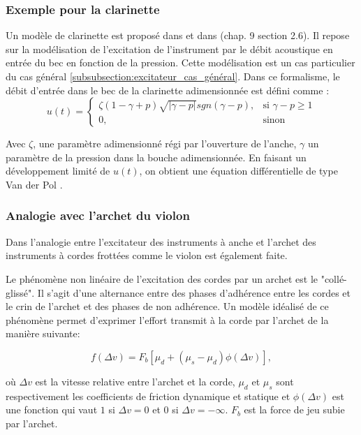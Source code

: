 \documentclass[atiam, article]{rapport} %
\begin{document}
\subsubsection{Exemple pour la clarinette}
Un modèle de clarinette est proposé dans \cite{missoum_explicit_2014} et dans \cite{chaigne2008acoustique} (chap. 9 section 2.6). Il repose sur la modélisation de l'excitation de l'instrument par le débit acoustique en entrée du bec en fonction de la pression. Cette modélisation est un cas particulier du cas général \ref{subsubsection:excitateur_cas_général}. 
Dans ce formalisme, le débit d'entrée dans le bec de la clarinette adimensionnée est défini comme : \\

\begin{equation}
    u(t) = \begin{cases}
    \zeta(1-\gamma+p)\sqrt{|\gamma-p|}sgn(\gamma-p),& \text{si }\gamma-p\geq 1\\
    0,              & \text{sinon}
\end{cases}
\end{equation}

Avec $\zeta$, une paramètre adimensionné régi par l'ouverture de l'anche, $\gamma$ un paramètre de la pression dans la bouche adimensionnée. En faisant un développement limité de $u(t)$, on obtient une équation différentielle de type Van der Pol \cite{chaigne2008acoustique}.

\subsubsection{Analogie avec l'archet du violon}

Dans \cite{ollivier_idealized_2004} l'analogie entre l'excitateur des instruments à anche et l'archet des instruments à cordes frottées comme le violon est également faite. 

Le phénomène non linéaire de l'excitation des cordes par un archet est le "collé-glissé". Il s'agit d'une alternance entre des phases d'adhérence entre les cordes et le crin de l'archet et des phases de non adhérence. Un modèle idéalisé de ce phénomène permet d'exprimer l'effort transmit à la corde par l'archet de la manière suivante:

$$f(\Delta v) = F_b[\mu _d +(\mu_s - \mu_d) \phi(\Delta v)],$$

où $\Delta v$ est la vitesse relative entre l'archet et la corde, $\mu _d$ et $\mu _s$ sont respectivement les coefficients de friction dynamique et statique et $\phi(\Delta v)$ est une fonction qui vaut $1$ si $\Delta v = 0$ et $0$ si $\Delta v = -\infty$. $F_b$ est la force de jeu subie par l'archet.
\end{document}
